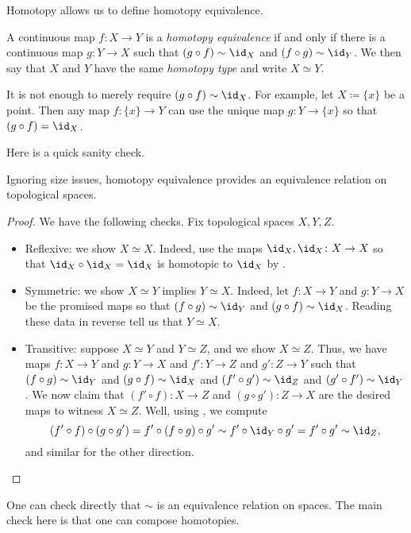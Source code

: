 \documentclass[../notes.tex]{subfiles}
\begin{document}
Homotopy allows us to define homotopy equivalence.
\begin{definition}
	A continuous map $f\colon X\to Y$ is a \textit{homotopy equivalence} if and only if there is a continuous map $g\colon Y\to X$ such that $(g\circ f)\sim\id_X$ and $(f\circ g)\sim\id_Y$. We then say that $X$ and $Y$ have the same \textit{homotopy type} and write $X\simeq Y$.
\end{definition}
\begin{remark}
	It is not enough to merely require $(g\circ f)\sim\id_X$. For example, let $X\coloneqq\{x\}$ be a point. Then any map $f\colon\{x\}\to Y$ can use the unique map $g\colon Y\to\{x\}$ so that $(g\circ f)=\id_X$.
\end{remark}
Here is a quick sanity check.
\begin{lemma}
	Ignoring size issues, homotopy equivalence provides an equivalence relation on topological spaces.
\end{lemma}
\begin{proof}
	We have the following checks. Fix topological spaces $X,Y,Z$. 
	\begin{itemize}
		\item Reflexive: we show $X\simeq X$. Indeed, use the maps $\id_X,\id_X\colon X\to X$ so that ${\id_X}\circ{\id_X}=\id_X$ is homotopic to $\id_X$ by .
		\item Symmetric: we show $X\simeq Y$ implies $Y\simeq X$. Indeed, let $f\colon X\to Y$ and $g\colon Y\to X$ be the promised maps so that $(f\circ g)\sim\id_Y$ and $(g\circ f)\sim\id_X$. Reading these data in reverse tell us that $Y\simeq X$.
		\item Transitive: suppose $X\simeq Y$ and $Y\simeq Z$, and we show $X\simeq Z$. Thus, we have maps $f\colon X\to Y$ and $g\colon Y\to X$ and $f'\colon Y\to Z$ and $g'\colon Z\to Y$ such that $(f\circ g)\sim\id_Y$ and $(g\circ f)\sim\id_X$ and $(f'\circ g')\sim\id_Z$ and $(g'\circ f')\sim\id_Y$. We now claim that $(f'\circ f)\colon X\to Z$ and $(g\circ g')\colon Z\to X$ are the desired maps to witness $X\simeq Z$. Well, using , we compute
		\[(f'\circ f)\circ(g\circ g')=f'\circ(f\circ g)\circ g'\sim f'\circ{\id_Y}\circ g'=f'\circ g'\sim\id_Z,\]
		and similar for the other direction.
		\qedhere
	\end{itemize}
\end{proof}
\begin{remark}
	One can check directly that $\sim$ is an equivalence relation on spaces. The main check here is that one can compose homotopies.
\end{remark}
\end{document}
